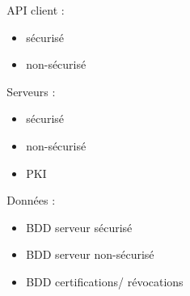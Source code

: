 \documentclass{beamer}
\begin{document}
{\begin{columns}
\begin{column}{.5\linewidth}
\begin{center}
  	  \end{center}
    \end{column}
    \begin{column}{.5\linewidth}
      API client :
      \begin{itemize}
      	\item sécurisé
      	\item non-sécurisé
      \end{itemize}
      
      Serveurs :
      \begin{itemize}
      	\item sécurisé
      	\item non-sécurisé
      	\item PKI
      \end{itemize}
      
      Données :
      \begin{itemize}
      	\item BDD serveur sécurisé
      	\item BDD serveur non-sécurisé
      	\item BDD certifications/ révocations
      \end{itemize}
    \end{column}
  \end{columns}
}
\end{document}
